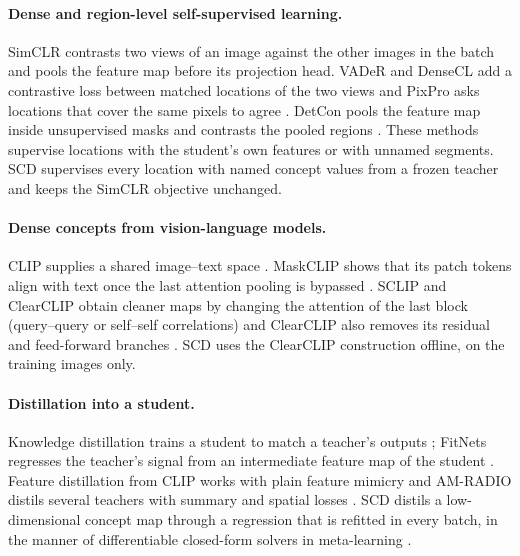 \documentclass[11pt]{article}
\begin{document}
\paragraph{Dense and region-level self-supervised learning.} SimCLR contrasts two views of an image against the other
images in the batch \citep{chen2020simclr} and pools the feature map before its projection head. VADeR and DenseCL
add a contrastive loss between matched locations of the two views \citep{pinheiro2020vader,wang2021densecl} and
PixPro asks locations that cover the same pixels to agree \citep{xie2021pixpro}. DetCon pools the feature map inside
unsupervised masks and contrasts the pooled regions \citep{henaff2021detcon}. These methods supervise locations with
the student's own features or with unnamed segments. SCD supervises every location with named concept values from a
frozen teacher and keeps the SimCLR objective unchanged.

\paragraph{Dense concepts from vision-language models.} CLIP supplies a shared image--text space
\citep{radford2021clip}. MaskCLIP shows that its patch tokens align with text once the last attention pooling is
bypassed \citep{zhou2022maskclip}. SCLIP and ClearCLIP obtain cleaner maps by changing the attention of the last block
(query--query or self--self correlations) and ClearCLIP also removes its residual and feed-forward branches
\citep{wang2024sclip,lan2024clearclip}. SCD uses the ClearCLIP construction offline, on the training images only.

\paragraph{Distillation into a student.} Knowledge distillation trains a student to match a teacher's outputs
\citep{hinton2015distilling}; FitNets regresses the teacher's signal from an intermediate feature map of the student
\citep{romero2015fitnets}. Feature distillation from CLIP works with plain feature mimicry \citep{yang2024clipkd} and
AM-RADIO distils several teachers with summary and spatial losses \citep{ranzinger2024radio}. SCD distils a
low-dimensional concept map through a regression that is refitted in every batch, in the manner of differentiable
closed-form solvers in meta-learning \citep{bertinetto2019r2d2,lee2019metaoptnet}.
\end{document}
